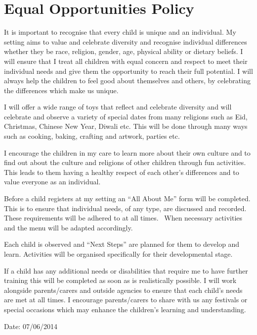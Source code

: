 

\section{Equal Opportunities Policy}

It is important to recognise that every child is unique and an
individual. My setting aims to value and celebrate diversity and
recognise individual differences whether they be race, religion, gender,
age, physical ability or dietary beliefs. I will ensure that I treat all
children with equal concern and respect to meet their individual needs
and give them the opportunity to reach their full potential. I will
always help the children to feel good about themselves and others, by
celebrating the differences which make us unique.

I will offer a wide range of toys that reflect and celebrate diversity
and will celebrate and observe a variety of special dates from many
religions such as Eid, Christmas, Chinese New Year, Diwali etc. This
will be done through many ways such as cooking, baking, crafting and
artwork, parties etc.

I encourage the children in my care to learn more about their own
culture and to find out about the culture and religions of other
children through fun activities. This leads to them having a healthy
respect of each other's differences and to value everyone as an
individual.

Before a child registers at my setting an ``All About Me'' form will be
completed. This is to ensure that individual needs, of any type, are
discussed and recorded. These requirements will be adhered to at all
times. ~When necessary activities and the menu will be adapted
accordingly.

Each child is observed and ``Next Steps'' are planned for them to
develop and learn. Activities will be organised specifically for their
developmental stage.

If a child has any additional needs or disabilities that require me to
have further training this will be completed as soon as is realistically
possible. I will work alongside parents/carers and outside agencies to
ensure that each child's needs are met at all times. I encourage
parents/carers to share with us any festivals or special occasions which
may enhance the children's learning and understanding.

Date: 07/06/2014



